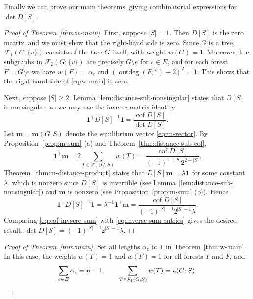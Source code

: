 \documentclass[12pt]{amsart}
\theoremstyle{definition}
\newcommand{\bone}{\mathbf{1}}
\newcommand{\boldm}{\mathbf{m}}
\newcommand{\tr}{\intercal}
\DeclareMathOperator{\cof}{cof}
\newcommand{\trees}{\mathcal{F}_1}
\newcommand{\forests}{\mathcal{F}}
\DeclareMathOperator{\outdeg}{outdeg}
\begin{document}
Finally we can prove our main theorems, giving combinatorial expressions for $\det D[S]$.
\begin{proof}[Proof of Theorem~\ref{thm:w-main}]
First, suppose $|S| = 1$.
Then $D[S]$ is the zero matrix, and we must show that the right-hand side is zero.
Since $G$ is a tree, $\trees(G; \{v\})$ consists of the tree $G$ itself, with weight $w({G}) = 1$.
Moreover, the subgraphs in $\forests_2(G; \{v\})$ are precisely $G \setminus e$ for $e \in E$, and for each forest $F = G \setminus e$ we have 
$w({F}) = \alpha_e$ and
$(\outdeg(F, *) - 2)^2 = 1$.
This shows that the right-hand side of \eqref{eq:w-main} is zero.

Next, suppose $|S| \geq 2$.
Lemma~\ref{lem:distance-sub-nonsingular} states that $D[S]$ is nonsingular, so we may use the inverse matrix identity
\begin{equation}\label{eq:cof-invsere-sum}
	\bone^\tr D[S]^{-1} \bone =
	\frac{\cof D[S]}{\det D[S]}. 
\end{equation}
Let $\boldm = \boldm(G; S)$ denote the equilibrium vector \eqref{eq:m-vector}.
By 
Proposition~\ref{prop:m-sum} (a) and Theorem~\ref{thm:distance-sub-cof},
\[
	\bone^\tr \boldm 
	= 2 \sum_{T \in \trees(G;S)} w({T})
	= \frac{\cof D[S]}{(-1)^{1 - |S|} 2^{2 - |S|} }.
\]
Theorem~\ref{thm:m-distance-product} states that $D[S] \boldm = \lambda \bone$
for some constant $\lambda$,
which is nonzero since $D[S]$ is invertible (see Lemma~\ref{lem:distance-sub-nonsingular}) and $\boldm$ is nonzero (see Proposition~\ref{prop:m-sum} (b)).
Hence
\begin{equation}\label{eq:inverse-sum-entries}
	\bone^\tr D[S]^{-1} \bone
	= \lambda^{-1} \bone^\tr \boldm
	= \frac{\cof D[S]}{(-1)^{|S| - 1} 2^{|S| - 1} \lambda} .
\end{equation}
Comparing \eqref{eq:cof-invsere-sum} with \eqref{eq:inverse-sum-entries} gives the desired result,
$\det D[S] = (-1)^{|S| - 1} 2^{|S| - 1} \lambda$.
\end{proof}

\begin{proof}[Proof of Theorem~\ref{thm:main}]
Set all lengths $\alpha_e$ to $1$ in Theorem~\ref{thm:w-main}.
In this case, the weights $w({T}) = 1$ and $w({F}) = 1$ for all forests $T$ and $F$,
and 
\[
	\sum_{e \in E} \alpha_e = n - 1, 
	\qquad \sum_{T \in \trees(G;S)} w({T}) = \kappa(G; S).
	\qedhere
\]
\end{proof}
\end{document}
